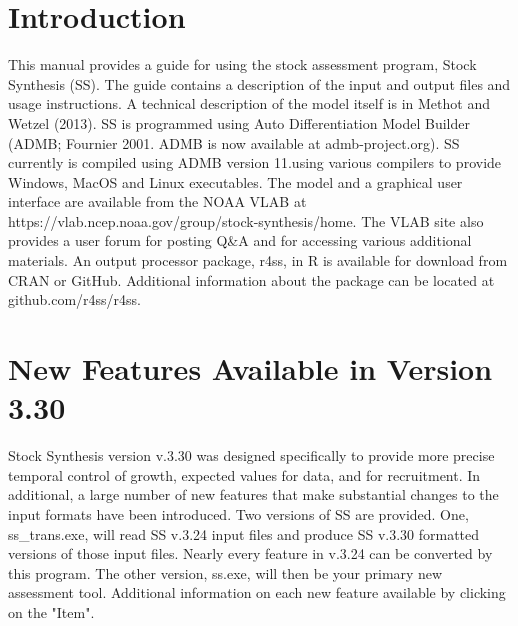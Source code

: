 
 \section{Introduction}\label{sec:intro}
 \begin{sloppypar}
This manual provides a guide for using the stock assessment program, Stock Synthesis (SS). The guide contains a description of the input and output files and usage instructions. A technical description of the model itself is in Methot and Wetzel (2013). SS is programmed using Auto Differentiation Model Builder (ADMB; Fournier 2001. ADMB is now available at admb-project.org). SS currently is compiled using ADMB version 11.using various compilers to provide Windows, MacOS and Linux executables. The model and a graphical user interface are available from the NOAA VLAB at https://vlab.ncep.noaa.gov/group/stock-synthesis/home. The VLAB site also provides a user forum for posting Q\&A and for accessing various additional materials.  An output processor package, r4ss, in R is available for download from CRAN or GitHub. Additional information about the package can be located at github.com/r4ss/r4ss.
\end{sloppypar}
	
\section{New Features Available in Version 3.30}
		Stock Synthesis version v.3.30 was designed specifically to provide more precise temporal control of growth, expected values for data, and for recruitment.  In additional, a large number of new features that make substantial changes to the input formats have been introduced.  Two versions of SS are provided.  One, ss\_trans.exe, will read SS v.3.24 input files and produce SS v.3.30 formatted versions of those input files.  Nearly every feature in v.3.24 can be converted by this program.  The other version, ss.exe, will then be your primary new assessment tool. Additional information on each new feature available by clicking on the "Item".
		
